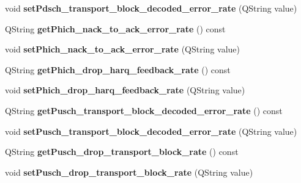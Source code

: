 \begin{DoxyCompactItemize}
\item 
void {\bfseries set\+Pdsch\+\_\+transport\+\_\+block\+\_\+decoded\+\_\+error\+\_\+rate} (Q\+String value)\hypertarget{class_channel_model_af2aa3eefdcd0b12b8a05e5e744739beb}{}\label{class_channel_model_af2aa3eefdcd0b12b8a05e5e744739beb}

\item 
Q\+String {\bfseries get\+Phich\+\_\+nack\+\_\+to\+\_\+ack\+\_\+error\+\_\+rate} () const \hypertarget{class_channel_model_a7f74c61a595816fbaa6e984463481468}{}\label{class_channel_model_a7f74c61a595816fbaa6e984463481468}

\item 
void {\bfseries set\+Phich\+\_\+nack\+\_\+to\+\_\+ack\+\_\+error\+\_\+rate} (Q\+String value)\hypertarget{class_channel_model_a8674c3b5df893e1ac1ce0bad20396f72}{}\label{class_channel_model_a8674c3b5df893e1ac1ce0bad20396f72}

\item 
Q\+String {\bfseries get\+Phich\+\_\+drop\+\_\+harq\+\_\+feedback\+\_\+rate} () const \hypertarget{class_channel_model_a776261ddef7703f0051894a1b42a43a9}{}\label{class_channel_model_a776261ddef7703f0051894a1b42a43a9}

\item 
void {\bfseries set\+Phich\+\_\+drop\+\_\+harq\+\_\+feedback\+\_\+rate} (Q\+String value)\hypertarget{class_channel_model_a9299679e312459d5f1e3cd32ec1af32d}{}\label{class_channel_model_a9299679e312459d5f1e3cd32ec1af32d}

\item 
Q\+String {\bfseries get\+Pusch\+\_\+transport\+\_\+block\+\_\+decoded\+\_\+error\+\_\+rate} () const \hypertarget{class_channel_model_a41f01b0e638ad55105670c36db050f39}{}\label{class_channel_model_a41f01b0e638ad55105670c36db050f39}

\item 
void {\bfseries set\+Pusch\+\_\+transport\+\_\+block\+\_\+decoded\+\_\+error\+\_\+rate} (Q\+String value)\hypertarget{class_channel_model_a1bc2f260af96252f04af7e2a34dde132}{}\label{class_channel_model_a1bc2f260af96252f04af7e2a34dde132}

\item 
Q\+String {\bfseries get\+Pusch\+\_\+drop\+\_\+transport\+\_\+block\+\_\+rate} () const \hypertarget{class_channel_model_afce214409f20400730aae94efbd8d604}{}\label{class_channel_model_afce214409f20400730aae94efbd8d604}

\item 
void {\bfseries set\+Pusch\+\_\+drop\+\_\+transport\+\_\+block\+\_\+rate} (Q\+String value)\hypertarget{class_channel_model_a8bd50476025b1aeb01bab5e919ce6fe5}{}\label{class_channel_model_a8bd50476025b1aeb01bab5e919ce6fe5}


\end{DoxyCompactItemize}
